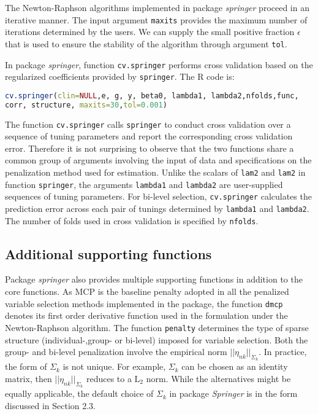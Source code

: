 \documentclass[12pt]{article}
\begin{document}
The Newton-Raphson algorithms implemented in package \emph{springer} proceed in an iterative manner. The input argument \texttt{maxits} provides the maximum number of iterations determined by the users. We can supply the small positive fraction $\epsilon$ that is used to ensure the stability of the algorithm through argument \texttt{tol}. 

In package \emph{springer}, function \texttt{cv.springer} performs cross validation based on the regularized coefficients provided by \texttt{springer}. The R code is: 

\begin{lstlisting}[language=R]
cv.springer(clin=NULL,e, g, y, beta0, lambda1, lambda2,nfolds,func,
corr, structure, maxits=30,tol=0.001)
\end{lstlisting}

The function \texttt{cv.springer} calls \texttt{springer} to conduct cross validation over a sequence of tuning parameters and report the corresponding cross validation error. Therefore it is not surprising to observe that the two functions share a common group of arguments involving the input of data and specifications on the penalization method used for estimation. Unlike the scalars of \texttt{lam2} and \texttt{lam2} in function \texttt{springer}, the arguments \texttt{lambda1} and \texttt{lambda2} are user-supplied sequences of tuning parameters. For bi-level selection, \texttt{cv.springer} calculates the prediction error across each pair of tunings determined by \texttt{lambda1} and \texttt{lambda2}. The number of folds used in cross validation is specified by \texttt{nfolds}. 


\subsection{Additional supporting functions}

Package \emph{springer} also provides multiple supporting functions in addition to the core functions. As MCP is the baseline penalty adopted in all the penalized variable selection methods implemented in the package, the function \texttt{dmcp} denotes its first order derivative function used in the formulation under the Newton-Raphson algorithm. The function \texttt{penalty} determines the type of sparse structure (individual-,group- or bi-level) imposed for variable selection. {\color{blue} Both the group- and bi-level penalization involve the  empirical norm $||\eta_{nk}||_{\Sigma_{k}}$. In practice, the form of $\Sigma_{k}$ is not unique. For example, $\Sigma_{k}$ can be chosen as an identity matrix, then $||\eta_{nk}||_{\Sigma_{k}}$ reduces to a $\text{L}_2$ norm. While the alternatives might be equally applicable, the default choice of $\Sigma_{k}$ in package \emph{Springer} is in the form discussed in Section 2.3. }
\end{document}
